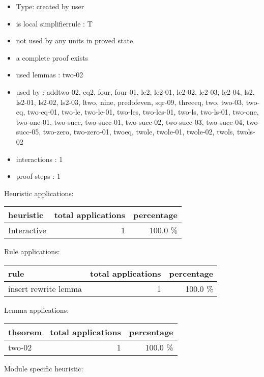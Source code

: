 \documentclass[a4paper]{article}
\begin{document}
\begin{itemize}

\item Type: created by user

\item is local simplifierrule : T
\item not used by any units in proved state.
\item       a complete proof exists
\item       used lemmas  : two-02
\item       used by      : addtwo-02, eq2, four, four-01, le2, le2-01, le2-02, le2-03, le2-04, ls2, ls2-01, ls2-02, ls2-03, ltwo, nine, predofeven, sqr-09, threeeq, two, two-03, two-eq, two-eq-01, two-le, two-le-01, two-les, two-les-01, two-ls, two-ls-01, two-one, two-one-01, two-succ, two-succ-01, two-succ-02, two-succ-03, two-succ-04, two-succ-05, two-zero, two-zero-01, twoeq, twole, twole-01, twole-02, twols, twols-02
\item       interactions : 1
\item       proof steps  : 1
\end{itemize}

\medskip


Heuristic applications:

\begin{supertabular}{l|r|r}
heuristic	& total applications & percentage \\ \hline
Interactive & 1 & 100.0 \% \\

\end{supertabular}

Rule applications:

\begin{supertabular}{l|r|r}
rule	        & total applications & percentage \\ \hline
insert rewrite lemma & 1 & 100.0 \% \\

\end{supertabular}

Lemma applications:

\begin{supertabular}{l|r|r}
theorem	        & total applications & percentage \\ \hline
two-02 & 1 & 100.0 \% \\

\end{supertabular}

Module specific heuristic:
\end{document}
